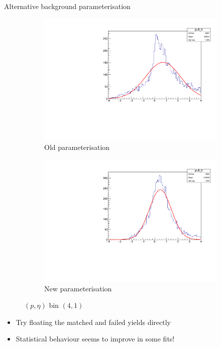 \documentclass[xcolor={dvipsnames}]{beamer}
\begin{document}
\begin{frame}{Alternative background parameterisation}
  \vspace{0.0cm}
  \begin{figure}[htb]
    \centering
    \begin{subfigure}{0.45\textwidth}
      \centering
      \includegraphics[width=1.0\textwidth]{Plots/signal_efficiency_pull_MuonUT_P4_ETA1.pdf}
      \caption*{Old parameterisation}
    \end{subfigure}%
    \begin{subfigure}{0.45\textwidth}
      \centering
      \includegraphics[width=1.0\textwidth]{Plots/signal_efficiency_pull_MuonUT_P4_ETA1_NoBkgEff.pdf}
      \caption*{New parameterisation}
    \end{subfigure}
    \vspace{-0.2cm}
    \caption*{$(p, \eta)$ bin $(4, 1)$}
  \end{figure}
  \begin{itemize}
    \item{Try floating the matched and failed yields directly}
    \item{Statistical behaviour seems to improve in some fits!}
  \end{itemize}
\end{frame}
\end{document}
